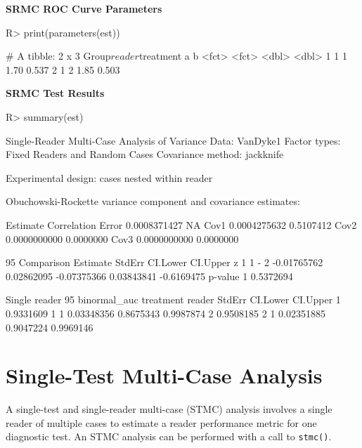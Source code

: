 \documentclass[
]{jss}
\begin{document}
\textbf{SRMC ROC Curve Parameters}

\begin{CodeChunk}
\begin{CodeInput}
R> print(parameters(est))
\end{CodeInput}
\begin{CodeOutput}
# A tibble: 2 x 3
  Group$reader $treatment     a     b
  <fct>        <fct>      <dbl> <dbl>
1 1            1           1.70 0.537
2 1            2           1.85 0.503
\end{CodeOutput}
\end{CodeChunk}

\textbf{SRMC Test Results}

\begin{CodeChunk}
\begin{CodeInput}
R> summary(est)
\end{CodeInput}
\begin{CodeOutput}
Single-Reader Multi-Case Analysis of Variance
Data: VanDyke1
Factor types: Fixed Readers and Random Cases
Covariance method: jackknife

Experimental design: cases nested within reader 

Obuchowski-Rockette variance component and covariance estimates:

          Estimate Correlation
Error 0.0008371427          NA
Cov1  0.0004275632   0.5107412
Cov2  0.0000000000   0.0000000
Cov3  0.0000000000   0.0000000


95%
  Comparison    Estimate     StdErr    CI.Lower    CI.Upper          z
1      1 - 2 -0.01765762 0.02862095 -0.07375366  0.03843841 -0.6169475
    p-value
1 0.5372694


Single reader 95%
  binormal_auc treatment reader     StdErr  CI.Lower  CI.Upper
1    0.9331609         1      1 0.03348356 0.8675343 0.9987874
2    0.9508185         2      1 0.02351885 0.9047224 0.9969146
\end{CodeOutput}
\end{CodeChunk}

\hypertarget{single-test-multi-case-analysis}{%
\section{Single-Test Multi-Case
Analysis}\label{single-test-multi-case-analysis}}

A single-test and single-reader multi-case (STMC) analysis involves a
single reader of multiple cases to estimate a reader performance metric
for one diagnostic test. An STMC analysis can be performed with a call
to \texttt{stmc()}.
\end{document}
